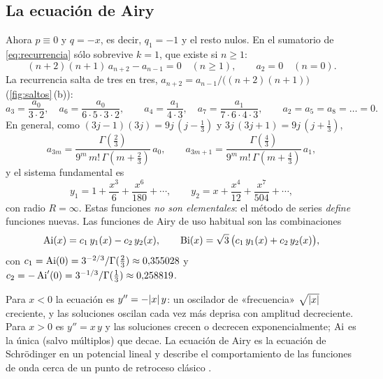 

\subsection{La ecuación de Airy}\label{sec:airy}

\begin{ejemplo}[$y''-x\,y=0$]\label{ej:airy}
Ahora $p\equiv0$ y $q=-x$, es decir, $q_1=-1$ y el resto nulos. En el
sumatorio de \eqref{eq:recurrencia} sólo sobrevive $k=1$, que existe si
$n\ge1$:
\begin{equation}\label{eq:rec-airy}
  (n+2)(n+1)\,a_{n+2}-a_{n-1}=0\quad(n\ge1),\qquad a_2=0\quad(n=0).
\end{equation}
La recurrencia salta de tres en tres, $a_{n+2}=a_{n-1}/\bigl((n+2)(n+1)\bigr)$
(\cref{fig:saltos}\,(b)):
\begin{equation}\label{eq:coef-airy}
  a_3=\frac{a_0}{3\cdot2},\quad a_6=\frac{a_0}{6\cdot5\cdot3\cdot2},\qquad
  a_4=\frac{a_1}{4\cdot3},\quad a_7=\frac{a_1}{7\cdot6\cdot4\cdot3},\qquad
  a_2=a_5=a_8=\dots=0 .
\end{equation}
En general, como $(3j-1)(3j)=9j\,(j-\tfrac13)$ y $3j\,(3j+1)=9j\,(j+\tfrac13)$,
\begin{equation}\label{eq:coef-airy-gamma}
  a_{3m}=\frac{\Gamma(\tfrac23)}{9^{m}\,m!\,\Gamma(m+\tfrac23)}\,a_0,
  \qquad
  a_{3m+1}=\frac{\Gamma(\tfrac43)}{9^{m}\,m!\,\Gamma(m+\tfrac43)}\,a_1 ,
\end{equation}
y el sistema fundamental es
\begin{equation}\label{eq:airy-y1y2}
  y_1=1+\frac{x^{3}}{6}+\frac{x^{6}}{180}+\cdots,\qquad
  y_2=x+\frac{x^{4}}{12}+\frac{x^{7}}{504}+\cdots ,
\end{equation}
con radio $R=\infty$. Estas funciones \emph{no son elementales}: el método de
series \emph{define} funciones nuevas. Las funciones de Airy de uso habitual
son las combinaciones \cite[§9.4]{DLMF}
\begin{equation}\label{eq:Ai-Bi}
  \operatorname{Ai}(x)=c_1\,y_1(x)-c_2\,y_2(x),\qquad
  \operatorname{Bi}(x)=\sqrt3\,\bigl(c_1\,y_1(x)+c_2\,y_2(x)\bigr),
\end{equation}
con $c_1=\operatorname{Ai}(0)=3^{-2/3}/\Gamma(\tfrac23)\approx0{,}355028$ y
$c_2=-\operatorname{Ai}'(0)=3^{-1/3}/\Gamma(\tfrac13)\approx0{,}258819$.
\end{ejemplo}

\begin{observacion}\label{obs:airy}
Para $x<0$ la ecuación es $y''=-\lvert x\rvert\,y$: un oscilador de «frecuencia»
$\sqrt{\lvert x\rvert}$ creciente, y las soluciones oscilan cada vez más deprisa
con amplitud decreciente. Para $x>0$ es $y''=x\,y$ y las soluciones crecen o
decrecen exponencialmente; $\operatorname{Ai}$ es la única (salvo múltiplos) que decae.
La ecuación de Airy es la ecuación de Schrödinger en un potencial lineal y
describe el comportamiento de las funciones de onda cerca de un punto de
retroceso clásico \cite[§10.2]{BENDER}.
\end{observacion}

